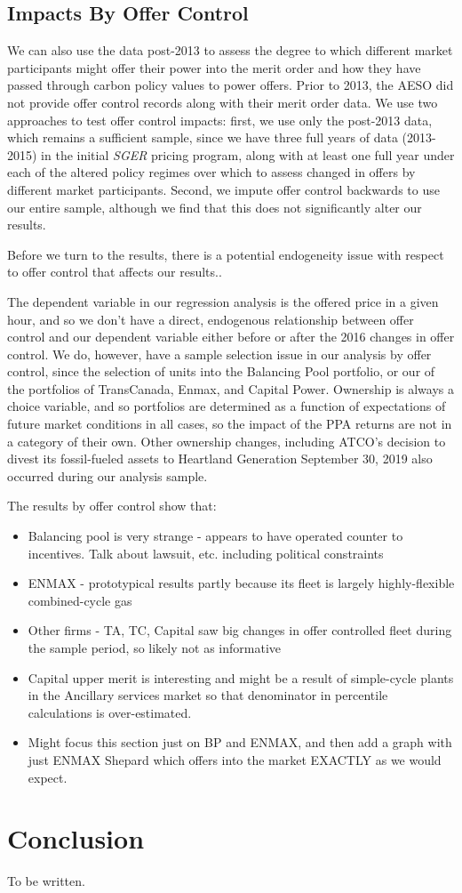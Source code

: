 \documentclass[12pt]{article}
\newcommand{\SGER}{\textit{SGER} }
\begin{document}
\subsection{Impacts By Offer Control}
We can also use the data post-2013 to assess the degree to which different market participants might offer their power into the merit order and how they have passed through carbon policy values to power offers. Prior to 2013, the AESO did not provide offer control records along with their merit order data. We use two approaches to test offer control impacts: first, we use only the post-2013 data, which remains a sufficient sample, since we have three full years of data (2013-2015) in the initial \SGER pricing program, along with at least one full year under each of the altered policy regimes over which to assess changed in offers by different market participants. Second, we impute offer control backwards to use our entire sample, although we find that this does not significantly alter our results.

Before we turn to the results, there is a potential endogeneity issue with respect to offer control that affects our results..


The dependent variable in our regression analysis is the offered price in a given hour, and so we don't have a direct, endogenous relationship between offer control and our dependent variable either before or after the 2016 changes in offer control. We do, however, have a sample selection issue in our analysis by offer control, since the selection of units into the Balancing Pool portfolio, or our of the portfolios of TransCanada, Enmax, and Capital Power. Ownership is always a choice variable, and so portfolios are determined as a function of expectations of future market conditions in all cases, so the impact of the PPA returns are not in a category of their own. Other ownership changes, including ATCO's decision to divest its fossil-fueled assets to Heartland Generation September 30, 2019 also occurred during our analysis sample. 

The results by offer control show that:
\begin{itemize}
  \item Balancing pool is very strange - appears to have operated counter to incentives. Talk about lawsuit, etc. including political constraints
  \item ENMAX - prototypical results partly because its fleet is largely highly-flexible combined-cycle gas
  \item Other firms - TA, TC, Capital saw big changes in offer controlled fleet during the sample period, so likely not as informative
  \item Capital upper merit is interesting and might be a result of simple-cycle plants in the Ancillary services market so that denominator in percentile calculations is over-estimated.
  \item Might focus this section just on BP and ENMAX, and then add a graph with just ENMAX Shepard which offers into the market EXACTLY as we would expect.
\end{itemize}

\section{Conclusion}\label{sec:conclusion}

To be written.




\end{document}

